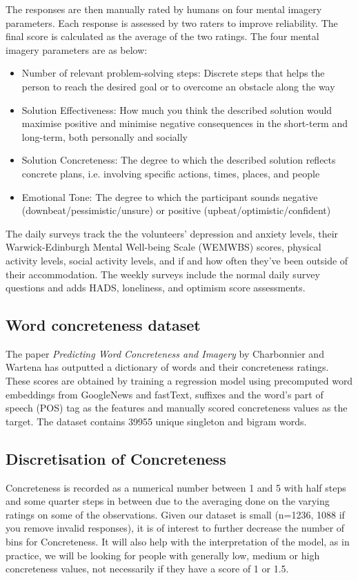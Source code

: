 \documentclass[12pt, a4paper]{article}
\begin{document}
The responses are then manually rated by humans on four mental imagery parameters. Each response is assessed by two raters to improve reliability. The final score is calculated as the average of the two ratings. The four mental imagery parameters are as below:

\begin{itemize}
  \item Number of relevant problem-solving steps: Discrete steps that helps the person to reach the desired goal or to overcome an obstacle along the way
  \item Solution Effectiveness: How much you think the described solution would maximise positive and minimise negative consequences in the short-term and long-term, both personally and socially
  \item Solution Concreteness: The degree to which the described solution reflects concrete plans, i.e. involving specific actions, times, places, and people
  \item Emotional Tone: The degree to which the participant sounds negative (downbeat/pessimistic/unsure) or positive (upbeat/optimistic/confident)
\end{itemize}

The daily surveys track the the volunteers' depression and anxiety levels, their Warwick-Edinburgh Mental Well-being Scale (WEMWBS) scores, physical activity levels,  social activity levels, and if and how often they've been outside of their accommodation. The weekly surveys include the normal daily survey questions and adds HADS, loneliness, and optimism score assessments.

\subsection{Word concreteness dataset}
The paper \textit{Predicting Word Concreteness and Imagery} \cite{charbonnier-wartena-2019-predicting} by Charbonnier and Wartena has outputted a dictionary of words and their concreteness ratings. These scores are obtained by training a regression model using precomputed word embeddings from GoogleNews and fastText, suffixes and the word's part of speech (POS) tag as the features and manually scored concreteness values as the target. The dataset contains 39955 unique singleton and bigram words.

\subsection{Discretisation of Concreteness}
Concreteness is recorded as a numerical number between 1 and 5 with half steps and some quarter steps in between due to the averaging done on the varying ratings on some of the observations. Given our dataset is small (n=1236, 1088 if you remove invalid responses), it is of interest to further decrease the number of bins for Concreteness. It will also help with the interpretation of the model, as in practice, we will be looking for people with generally low, medium or high concreteness values, not necessarily if they have a score of 1 or 1.5. 
\end{document}
